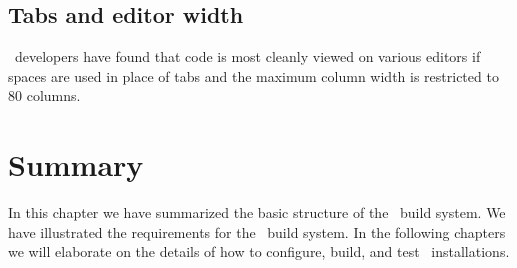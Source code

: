 \subsection{Tabs and editor width}
\label{sec:cc-tabs}

\draco\ developers have found that code is most cleanly viewed on various editors if spaces are used in place of tabs and the maximum column width is restricted to 80 columns.


\section{Summary}

In this chapter we have summarized the basic structure of the \draco\ 
build system.  We have illustrated the requirements for the \draco\ 
build system.  In the following chapters we will elaborate on the
details of how to configure, build, and test \draco\ installations.


